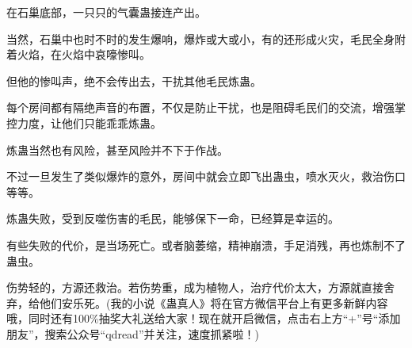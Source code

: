 \begin{this_body}
在石巢底部，一只只的气囊蛊接连产出。

当然，石巢中也时不时的发生爆响，爆炸或大或小，有的还形成火灾，毛民全身附着火焰，在火焰中哀嚎惨叫。

但他的惨叫声，绝不会传出去，干扰其他毛民炼蛊。

每个房间都有隔绝声音的布置，不仅是防止干扰，也是阻碍毛民们的交流，增强掌控力度，让他们只能乖乖炼蛊。

炼蛊当然也有风险，甚至风险并不下于作战。

不过一旦发生了类似爆炸的意外，房间中就会立即飞出蛊虫，喷水灭火，救治伤口等等。

炼蛊失败，受到反噬伤害的毛民，能够保下一命，已经算是幸运的。

有些失败的代价，是当场死亡。或者脑萎缩，精神崩溃，手足消残，再也炼制不了蛊虫。

伤势轻的，方源还救治。若伤势重，成为植物人，治疗代价太大，方源就直接舍弃，给他们安乐死。(我的小说《蛊真人》将在官方微信平台上有更多新鲜内容哦，同时还有100\%抽奖大礼送给大家！现在就开启微信，点击右上方“+”号“添加朋友”，搜索公众号“qdread”并关注，速度抓紧啦！)

\end{this_body}

